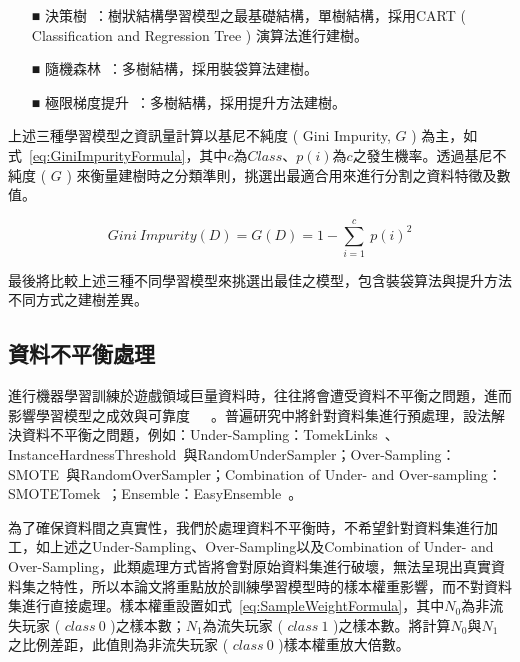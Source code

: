 \begin{itemize}
  \item [■] 決策樹~\cite{breiman1984classification}：樹狀結構學習模型之最基礎結構，單樹結構，採用CART ( Classification and Regression Tree ) 演算法進行建樹。
  \item [■] 隨機森林~\cite{breiman2001random}：多樹結構，採用裝袋算法建樹。
  \item [■] 極限梯度提升~\cite{chen2016xgboost}：多樹結構，採用提升方法建樹。
\end{itemize}

上述三種學習模型之資訊量計算以基尼不純度 ( Gini Impurity, $G$ ) 為主，如式~\ref{eq:GiniImpurityFormula}，其中$c$為$Class$、$p(i)$為$c$之發生機率。透過基尼不純度 ( $G$ ) 來衡量建樹時之分類準則，挑選出最適合用來進行分割之資料特徵及數值。

\begin{equation}
  \label{eq:GiniImpurityFormula}
  Gini\ Impurity(D) = G(D) = 1 - \sum_{i = 1}^{c}\ p(i)^2
\end{equation}

最後將比較上述三種不同學習模型來挑選出最佳之模型，包含裝袋算法與提升方法不同方式之建樹差異。

\subsection{資料不平衡處理}
\label{subsec:ImbalancedDataHandle}

進行機器學習訓練於遊戲領域巨量資料時，往往將會遭受資料不平衡之問題，進而影響學習模型之成效與可靠度~\cite{sifa2015predicting}~\cite{lee2016predicting}~\cite{chawla2009data}。普遍研究中將針對資料集進行預處理，設法解決資料不平衡之問題，例如：Under-Sampling：TomekLinks~\cite{4309452}、InstanceHardnessThreshold~\cite{smith2014instance}與RandomUnderSampler；Over-Sampling：SMOTE~\cite{chawla2002smote}與RandomOverSampler；Combination of Under- and Over-sampling：SMOTETomek~\cite{batista2003balancing}；Ensemble：EasyEnsemble~\cite{liu2008exploratory}。

為了確保資料間之真實性，我們於處理資料不平衡時，不希望針對資料集進行加工，如上述之Under-Sampling、Over-Sampling以及Combination of Under- and Over-Sampling，此類處理方式皆將會對原始資料集進行破壞，無法呈現出真實資料集之特性，所以本論文將重點放於訓練學習模型時的樣本權重影響，而不對資料集進行直接處理。樣本權重設置如式~\ref{eq:SampleWeightFormula}，其中$N_0$為非流失玩家 ( $class\ 0$ )之樣本數；$N_1$為流失玩家 ( $class\ 1$ )之樣本數。將計算$N_0$與$N_1$之比例差距，此值則為非流失玩家 ( $class\ 0$ )樣本權重放大倍數。

